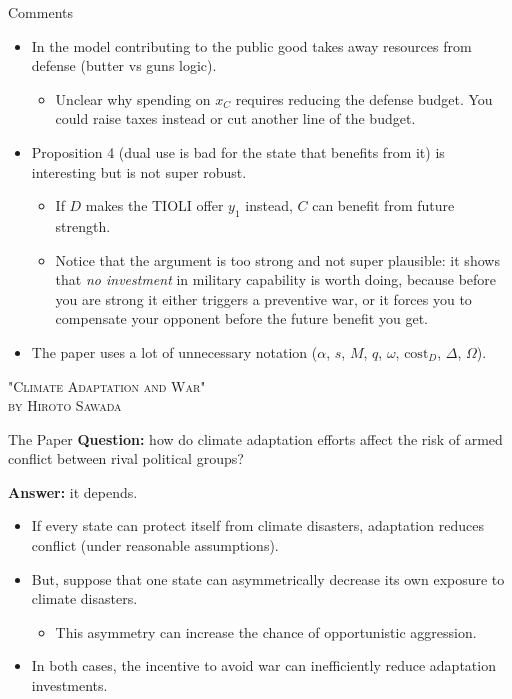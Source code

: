 \documentclass[ignorenonframetext,c,12pt]{beamer}
\newcommand{\blue}[1]{{\color{blendedblue}#1}}
\begin{document}
\begin{frame}{Comments}
  \begin{itemize}
    \item In the model contributing to the public good takes away resources from defense (butter vs guns logic).
    \begin{itemize}
      \item Unclear why spending on $x_C$ requires reducing the defense budget. You could raise taxes instead or cut another line of the budget.
    \end{itemize}
    \item Proposition 4 (dual use is bad for the state that benefits from it) is interesting but is not super robust.
    \begin{itemize}
      \item If $D$ makes the TIOLI offer $y_1$ instead, $C$ can benefit from future strength.
      \item Notice that the argument is too strong and not super plausible: it shows that \textit{no investment} in military capability is worth doing, because before you are strong it either triggers a preventive war, or it forces you to compensate your opponent before the future benefit you get.
    \end{itemize}
    \item The paper uses a lot of unnecessary notation ($\alpha$, $s$, $M$, $q$, $\omega$, $\text{cost}_D$, $\Delta$, $\Omega$).
  \end{itemize}
\end{frame}

\begin{frame}{}
  \centering
  \blue{\textsc{\LARGE "Climate Adaptation and War" \\[0.5em] by Hiroto Sawada}}
\end{frame}

\begin{frame}{The Paper}
  \textbf{Question:} how do climate adaptation efforts affect the risk of armed conflict between rival political groups?

  \textbf{Answer:} it depends.
  \begin{itemize}
    \item If every state can protect itself from climate disasters, adaptation reduces conflict (under reasonable assumptions).
    \item But, suppose that one state can asymmetrically decrease its own exposure to climate disasters.
    \begin{itemize}
      \item This asymmetry can increase the chance of opportunistic aggression.
    \end{itemize}
    \item In both cases, the incentive to avoid war can inefficiently reduce adaptation investments.
  \end{itemize}
\end{frame}
\end{document}
